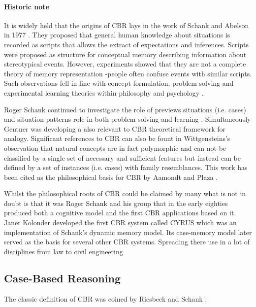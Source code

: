 \paragraph{Historic note}
\label{History} It is widely held that the origins of CBR lays in the work of 
Schank and Abelson in 1977 \cite{Schank_Abelson_1977}. They proposed that general 
human knowledge about situations is recorded as scripts that allows the extract 
of expectations and inferences. Scripts were proposed as structure for conceptual 
memory describing information about stereotypical events. However, experiments 
showed that they are not a complete theory of memory representation -people 
often confuse events with similar scripts. Such observations fell in line with 
concept formulation, problem solving and experimental learning theories within 
philosophy and psychology \cite{tulving_1977,smith_1978}. 

Roger Schank continued to investigate the role of previews situations (i.e. cases) 
and situation patterns role in both problem solving and learning \cite{Schank_1982}. 
Simultaneously Gentner \cite{genter_1983} was developing a also relevant to CBR 
theoretical framework for analogy. Significant references to CBR can also be fount in 
Wittgensteins's observation \cite{wittgestein_1953} that natural concepts are in fact 
polymorphic and can not be classified by a single set of necessary and sufficient 
features but instead can be defined by a set of instances (i.e. cases) with family 
resemblances. This work has been cited as the philosophical basis for CBR by Aamondt and Plaza \cite{aamond_plaza_1994}.

Whilst the philosophical roots of CBR could be claimed by many what is not in doubt 
is that it was Roger Schank and his group that in the early eighties produced both 
a cognitive model and the first CBR applications based on it. Janet Kolonder developed 
the first CBR system called CYRUS \cite{kolodner_1983a,kolodner_1983b} which was an 
implementation of Schank's dynamic memory model. Its case-memory model later served 
as the basis for several other CBR systems. Spreading there use in a lot of disciplines 
from law \cite{ashley_1988,rissland_skalak_1989} to civil engineering \cite{whatson_abdullah_1994,moore_1994}
\subsection{Case-Based Reasoning}
\label {CBR}  The classic definition of CBR was coined by Riesbeck and Schank \cite{riesbeck_1989}:

